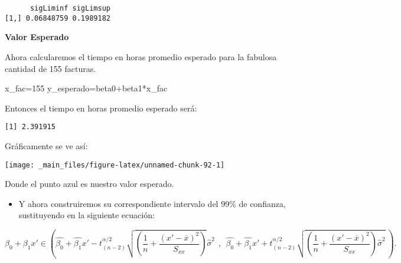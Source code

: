 \documentclass[
  a4paper,
  oneside,
  openany]{book}
\newenvironment{Shaded}{\begin{snugshade}}{\end{snugshade}}
\newcommand{\DecValTok}[1]{\textcolor[rgb]{0.00,0.00,0.81}{#1}}
\newcommand{\NormalTok}[1]{#1}
\newcommand{\OtherTok}[1]{\textcolor[rgb]{0.56,0.35,0.01}{#1}}
\newcommand{\SpecialCharTok}[1]{\textcolor[rgb]{0.00,0.00,0.00}{#1}}
\providecommand{\tightlist}{%
  \setlength{\itemsep}{0pt}\setlength{\parskip}{0pt}}
\begin{document}
\begin{verbatim}
      sigLiminf sigLimsup
[1,] 0.06848759 0.1989182
\end{verbatim}

\textbf{Valor Esperado}

Ahora calcularemos el tiempo en horas promedio esperado para la fabulosa cantidad de 155 facturas.

\begin{Shaded}
\begin{Highlighting}[]
\NormalTok{x\_fac}\OtherTok{=}\DecValTok{155}
\NormalTok{y\_esperado}\OtherTok{=}\NormalTok{beta0}\SpecialCharTok{+}\NormalTok{beta1}\SpecialCharTok{*}\NormalTok{x\_fac}
\end{Highlighting}
\end{Shaded}

Entonces el tiempo en horas promedio esperado será:

\begin{verbatim}
[1] 2.391915
\end{verbatim}

Gráficamente se ve así:

\begin{center}\texttt{[image: \_main\_files/figure-latex/unnamed-chunk-92-1]} \end{center}

Donde el punto azul es nuestro valor esperado.

\begin{itemize}
\tightlist
\item
  Y ahora construiremos su correspondiente intervalo del 99\% de confianza, sustituyendo en la siguiente ecuación:
\end{itemize}

\[\beta_{0}+\beta_{1}x' \in \left(\hat{\beta_{0}}+\hat{\beta_{1}}x'-t_{(n-2)}^{\alpha/2}\sqrt{\left( \frac{1}{n}+\frac{(x'-\overline{x})^2}{S_{xx}}\right)}\hat{\sigma}^2 \ \ , \ \ \hat{\beta_{0}}+\hat{\beta_{1}}x'+t_{(n-2)}^{\alpha/2}\sqrt{\left( \frac{1}{n}+\frac{(x'-\overline{x})^2}{S_{xx}}\right)\hat{\sigma}^2} \ \right).\]
\end{document}
